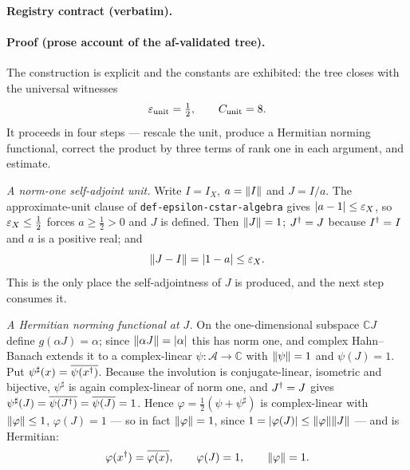 \noindent\textbf{Registry contract (verbatim).}

\paragraph{Proof (prose account of the af-validated tree).}
The construction is explicit and the constants are exhibited: the tree closes with the
universal witnesses
\begin{equation}\label{eq:eur-constants}
  \varepsilon_{\mathrm{unit}}=\tfrac12,\qquad C_{\mathrm{unit}}=8 .
\end{equation}
It proceeds in four steps --- rescale the unit, produce a Hermitian norming functional,
correct the product by three terms of rank one in each argument, and estimate.

\emph{A norm-one self-adjoint unit.} Write $I=I_X$, $a=\lVert I\rVert$ and $J=I/a$. The
approximate-unit clause of \texttt{def-epsilon-cstar-algebra} gives $\lvert a-1\rvert\le\varepsilon_X$,
so $\varepsilon_X\le\tfrac12$ forces $a\ge\tfrac12>0$ and $J$ is defined. Then $\lVert J\rVert=1$;
$J^{\dagger}=J$ because $I^{\dagger}=I$ and $a$ is a positive real; and
\begin{equation}\label{eq:eur-J}
  \lVert J-I\rVert=\lvert 1-a\rvert\le\varepsilon_X .
\end{equation}
This is the only place the self-adjointness of $J$ is produced, and the next step consumes
it.

\emph{A Hermitian norming functional at $J$.} On the one-dimensional subspace $\mathbb CJ$
define $g(\alpha J)=\alpha$; since $\lVert \alpha J\rVert=\lvert\alpha\rvert$ this has norm one, and
complex Hahn--Banach extends it to a complex-linear $\psi:\mathcal A\to\mathbb C$ with
$\lVert \psi\rVert=1$ and $\psi(J)=1$. Put $\psi^{\sharp}(x)=\overline{\psi(x^{\dagger})}$. Because the
involution is conjugate-linear, isometric and bijective, $\psi^{\sharp}$ is again
complex-linear of norm one, and $J^{\dagger}=J$ gives
$\psi^{\sharp}(J)=\overline{\psi(J^{\dagger})}=\overline{\psi(J)}=1$. Hence
$\varphi=\tfrac12(\psi+\psi^{\sharp})$ is complex-linear with $\lVert \varphi\rVert\le1$,
$\varphi(J)=1$ --- so in fact $\lVert \varphi\rVert=1$, since $1=\lvert\varphi(J)\rvert\le\lVert \varphi\rVert\lVert J\rVert$ ---
and is Hermitian:
\begin{equation}\label{eq:eur-phi}
  \varphi(x^{\dagger})=\overline{\varphi(x)},\qquad \varphi(J)=1,\qquad \lVert \varphi\rVert=1 .
\end{equation}

